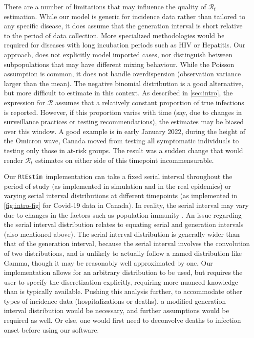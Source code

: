 \documentclass[10pt,letterpaper]{article}
\def\RtEstim{\texttt{RtEstim}}
\def\calR{\mathcal{R}}
\begin{document}
There are a number of limitations that may influence the quality of
$\calR_t$ estimation. While our model is generic for incidence data 
rather than tailored to any specific disease, it does assume that the 
generation interval is short relative to the period of data collection. 
More specialized methodologies would be required for diseases with long 
incubation periods such as HIV or Hepatitis. 
Our approach, does not explicitly model imported cases, nor distinguish between
subpopulations that may have different mixing behaviour. 
While the Poisson assumption is common, it does not handle overdispersion
(observation variance larger than the mean). The negative binomial distribution
is a good alternative, but more difficult to estimate in this context.
As described in \autoref{sec:intro}, the expression for $\calR$ 
assumes that a relatively constant proportion of true infections is reported. 
However, if this proportion varies with time (say, due to changes in surveillance
practices or testing recommendations), the estimates may be biased over this
window. A good example is in early January 2022, during the height of the
Omicron wave, Canada moved from testing all symptomatic individuals to
testing only those in at-risk groups. The result was a sudden change that would
render $\calR_t$ estimates on either side of this timepoint incommensurable.


Our \RtEstim\ implementation can take a fixed serial interval throughout the
period of study (as implemented in simulation and in the real epidemics) or 
varying serial interval distributions at different timepoints (as implemented 
in \autoref{fig:intro-fig} for Covid-19 data in Canada). In reality, the serial
interval may vary due to changes in the factors such as population immunity 
\cite{nash2023estimating}. An issue regarding the serial interval distribution 
relates to equating serial and generation intervals (also mentioned above). 
The serial interval distribution is generally wider than that 
of the generation interval, because the serial interval involves the convolution
of two distributions, and is unlikely to actually follow a named distribution
like Gamma, though it may be reasonably well approximated by one. Our
implementation allows for an arbitrary distribution to be used, but requires the
user to specify the discretization explicitly, requiring more nuanced knowledge
than is typically available. Pushing this analysis further, to accommodate other
types of incidence data (hospitalizations or deaths), a modified generation
interval distribution would be necessary, and further assumptions would be
required as well. Or else, one would first need to deconvolve deaths to
infection onset before using our software.
\end{document}
